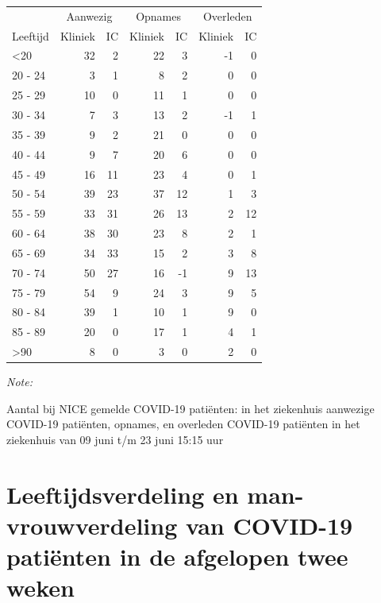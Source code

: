 \documentclass[
  english,
  man,floatsintext]{apa6}
\begin{document}
\begin{table}
\centering\begingroup\fontsize{10}{12}\selectfont

\begin{threeparttable}
\begin{tabular}{lrrrrrr}
\toprule
\multicolumn{1}{c}{ } & \multicolumn{2}{c}{Aanwezig} & \multicolumn{2}{c}{Opnames} & \multicolumn{2}{c}{Overleden} \\
\cmidrule(l{3pt}r{3pt}){2-3} \cmidrule(l{3pt}r{3pt}){4-5} \cmidrule(l{3pt}r{3pt}){6-7}
Leeftijd & Kliniek & IC & Kliniek & IC & Kliniek & IC\\
\midrule
<20 & 32 & 2 & 22 & 3 & -1 & 0\\
20 - 24 & 3 & 1 & 8 & 2 & 0 & 0\\
25 - 29 & 10 & 0 & 11 & 1 & 0 & 0\\
30 - 34 & 7 & 3 & 13 & 2 & -1 & 1\\
35 - 39 & 9 & 2 & 21 & 0 & 0 & 0\\
40 - 44 & 9 & 7 & 20 & 6 & 0 & 0\\
45 - 49 & 16 & 11 & 23 & 4 & 0 & 1\\
50 - 54 & 39 & 23 & 37 & 12 & 1 & 3\\
55 - 59 & 33 & 31 & 26 & 13 & 2 & 12\\
60 - 64 & 38 & 30 & 23 & 8 & 2 & 1\\
65 - 69 & 34 & 33 & 15 & 2 & 3 & 8\\
70 - 74 & 50 & 27 & 16 & -1 & 9 & 13\\
75 - 79 & 54 & 9 & 24 & 3 & 9 & 5\\
80 - 84 & 39 & 1 & 10 & 1 & 9 & 0\\
85 - 89 & 20 & 0 & 17 & 1 & 4 & 1\\
>90 & 8 & 0 & 3 & 0 & 2 & 0\\
\bottomrule
\end{tabular}
\begin{tablenotes}
\item \textit{Note: } 
\item Aantal bij NICE gemelde COVID-19 patiënten: in het ziekenhuis aanwezige COVID-19 patiënten, opnames, en overleden COVID-19 patiënten in het ziekenhuis van 09 juni t/m 23 juni 15:15 uur
\end{tablenotes}
\end{threeparttable}
\endgroup{}
\end{table}

\newpage

\hypertarget{leeftijdsverdeling-en-man-vrouwverdeling-van-covid-19-patiuxebnten-in-de-afgelopen-twee-weken}{%
\section{Leeftijdsverdeling en man-vrouwverdeling van COVID-19 patiënten in de afgelopen twee weken}\label{leeftijdsverdeling-en-man-vrouwverdeling-van-covid-19-patiuxebnten-in-de-afgelopen-twee-weken}}
\end{document}
